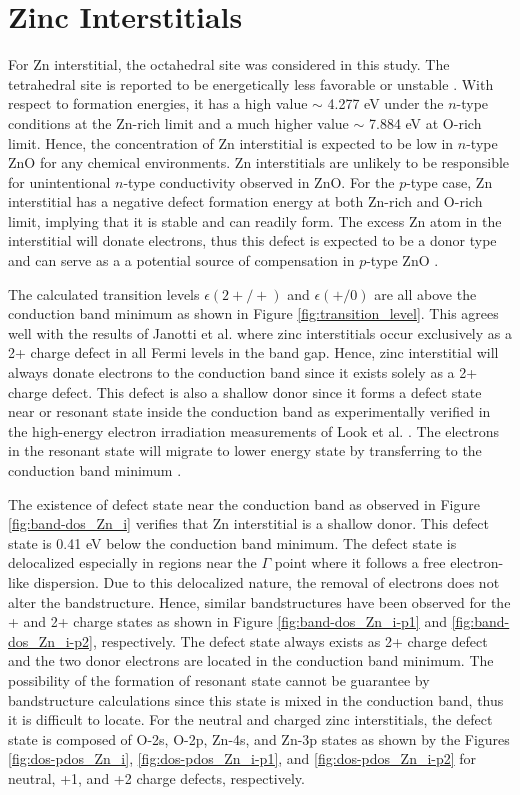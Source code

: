 \clearpage

\section{Zinc Interstitials}

For Zn interstitial, the octahedral site was considered in this study. The tetrahedral site is reported to be energetically less favorable or unstable \citep{Oba2001,Zhao2006,Oba2010}. With respect to formation energies, it has a high value   $\sim$ 4.277 eV under the $n$-type conditions at the  Zn-rich limit and a much higher value  $\sim$ 7.884 eV at O-rich limit. Hence, the concentration of Zn interstitial is expected to be low in $n$-type ZnO for any chemical environments. Zn interstitials are unlikely to be responsible for unintentional $n$-type conductivity observed in ZnO. For the $p$-type case, Zn interstitial has a negative defect formation energy at both Zn-rich and O-rich limit, implying that it is stable and can readily form. The excess Zn atom in the interstitial will donate electrons, thus this defect is expected to be a donor type and can serve as a a potential source of compensation in $p$-type ZnO \citep{Janotti2007}.

The calculated transition levels $\epsilon(2+/+)$ and $\epsilon(+/0)$ are all above the conduction band minimum as shown in Figure \ref{fig:transition_level}. This agrees well with the results of Janotti et al. \citep{Janotti2007} where zinc interstitials occur exclusively as a 2+ charge defect in all Fermi levels in the band gap. Hence, zinc interstitial will always donate electrons to the conduction band since it exists solely as a 2+ charge defect. This defect is also a shallow donor since it forms a  defect state near or resonant state inside the conduction band as experimentally verified in the high-energy electron irradiation measurements of Look et al. \citep{Look1999}. The electrons in the resonant state will 	migrate to lower energy state by transferring to the conduction band minimum \citep{Freysoldt2014}.

The existence of defect state near the conduction band as observed in Figure \ref{fig:band-dos_Zn_i} verifies that Zn interstitial is a shallow donor. This defect state is 0.41 eV below the conduction band minimum.  The defect state is delocalized especially in regions near the $\Gamma$ point where it follows a free electron-like dispersion. Due to this delocalized nature, the  removal of electrons does not alter the bandstructure. Hence, similar bandstructures have been observed for the + and 2+ charge states as shown in Figure
\ref{fig:band-dos_Zn_i-p1} and \ref{fig:band-dos_Zn_i-p2}, respectively. The defect state always exists as 2+ charge defect and the two donor electrons are located in the conduction band minimum. The possibility of the formation of resonant state cannot be guarantee by bandstructure calculations since this state is mixed in the conduction band, thus it is difficult to locate. For the neutral and charged zinc interstitials, the defect state is composed of O-2s, O-2p, Zn-4s, and Zn-3p states as shown by the Figures \ref{fig:dos-pdos_Zn_i}, \ref{fig:dos-pdos_Zn_i-p1}, and \ref{fig:dos-pdos_Zn_i-p2} for neutral, +1, and +2 charge defects, respectively.

